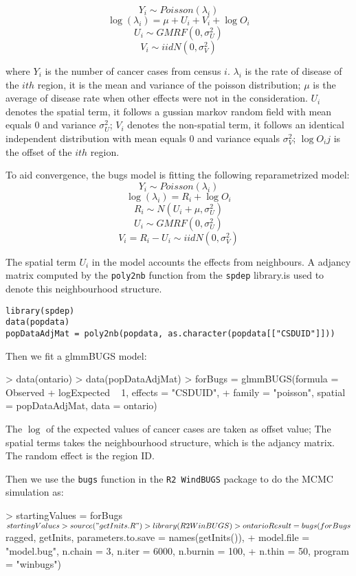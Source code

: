 \documentclass{article}
\begin{document}
\[Y_{i} \sim  Poisson(\lambda_i)\]
\[\log(\lambda_{i}) = \mu + U_i + V_i+ \log{O_i}\]
\[U_i \sim GMRF(0, \sigma_U^2)\]
\[V_i \sim iid N(0, \sigma_V^2)\] 

where $Y_{i}$ is the number of cancer cases from census $i$. 
$\lambda_{i}$ is the rate of disease of the $ith$ region, it is the mean and variance of the poisson distribution; 
$\mu$ is the average of disease rate when other effects were not in the consideration.
$U_i$ denotes the spatial term, it follows a gussian markov random field with mean equals $0$ and variance $\sigma_U^2$; 
$V_i$ denotes the non-spatial term, it follows an identical independent distribution with mean equals $0$ and variance equals $\sigma_V^2$; 
$\log{O_ij}$ is the offset of the $ith$ region.


To aid convergence, the bugs model is fitting the following reparametrized model:
\[Y_{i} \sim  Poisson(\lambda_i)\]
\[\log(\lambda_i) = R_i+ \log{O_i}\]
\[R_i \sim N(U_i + \mu, \sigma_U^2)\]
\[U_i \sim GMRF(0, \sigma_U^2)\]
\[V_{i} = R_i - U_i \sim iid N(0, \sigma_V^2)\] 

The spatial term $U_i$ in the model accounts the effects from neighbours. A adjancy matrix computed by the \verb!poly2nb! function from the \verb!spdep! library.is used to denote this neighbourhood structure.

\begin{verbatim}
library(spdep)
data(popdata)
popDataAdjMat = poly2nb(popdata, as.character(popdata[["CSDUID"]]))
\end{verbatim}

Then we fit a glmmBUGS model: 
\begin{Schunk}
\begin{Sinput}
> data(ontario)
> data(popDataAdjMat)
> forBugs = glmmBUGS(formula = Observed + logExpected ~ 1, effects = "CSDUID", 
+     family = "poisson", spatial = popDataAdjMat, data = ontario)
\end{Sinput}
\end{Schunk}

The $\log$ of the expected values of cancer cases are taken as offset value; The spatial terms takes the neighbourhood structure, which is the adjancy matrix. The random effect is the region ID.

Then we use the \verb!bugs! function in the \verb!R2 WindBUGS! package to do the MCMC simulation as: 
\begin{Schunk}
\begin{Sinput}
> startingValues = forBugs$startingValues
> source("getInits.R")
> library(R2WinBUGS)
> ontarioResult = bugs(forBugs$ragged, getInits, parameters.to.save = names(getInits()), 
+     model.file = "model.bug", n.chain = 3, n.iter = 6000, n.burnin = 100, 
+     n.thin = 50, program = "winbugs")
\end{Sinput}
\end{Schunk}
\end{document}
